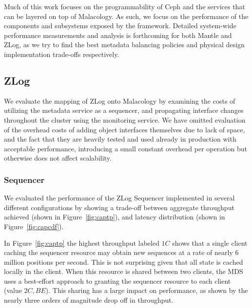 \documentclass[10pt,twocolumn]{article}
\begin{document}
Much of this work focuses on the programmability of Ceph and the services that
can be layered on top of Malacology. As such, we focus on the performance of
the components and subsystems exposed by the framework. Detailed system-wide
performance measurements and analysis is forthcoming for both Mantle and ZLog,
as we try to find the best metadata balancing policies and physical design
implementation trade-offs respectively.

\subsection{ZLog}

We evaluate the mapping of ZLog onto Malacology by examining the costs of
utilizing the metadata service as a sequencer, and propagating interface
changes throughout the cluster using the monitoring service. We have omitted
evaluation of the overhead costs of adding object interfaces themselves due to
lack of space, and the fact that they are heavily tested and used already in
production with acceptable performance, introducing a small constant overhead
per operation but otherwise does not affect scalability.

\subsubsection{Sequencer}

We evaluated the performance of the ZLog Sequencer implemented in several
different configurations by showing a trade-off between aggregate throughput
achieved (shown in Figure~\ref{fig:captp}), and latency distribution (shown in
Figure~\ref{fig:capcdf}).

In Figure~\ref{fig:captp} the highest throughput labeled $1C$ shows that a
single client caching the sequencer resource may obtain new sequences at a rate
of nearly 6 million positions per second. This is not surprising given that all
state is cached locally in the client. When this resource is shared between two
clients, the MDS uses a best-effort approach to granting the sequencer resource
to each client (value $2C,BE$). This sharing has a large impact on performance,
as shown by the nearly three orders of magnitude drop off in throughput.
\end{document}
